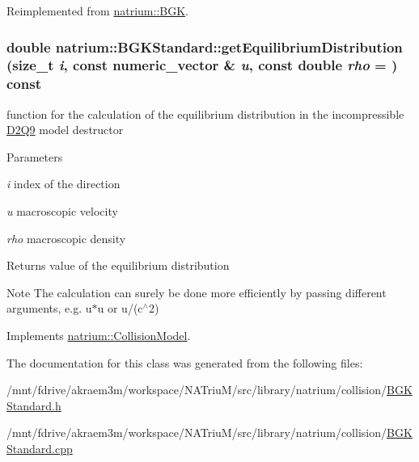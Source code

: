 Reimplemented from \hyperlink{classnatrium_1_1BGK_ae5e97a4995fe927e9042a6cffac80acc}{natrium::BGK}.\hypertarget{classnatrium_1_1BGKStandard_a3d45ef2fe5536bf14914f99297477754}{
\subsubsection[{getEquilibriumDistribution}]{\setlength{\rightskip}{0pt plus 5cm}double natrium::BGKStandard::getEquilibriumDistribution (size\_\-t {\em i}, \/  const numeric\_\-vector \& {\em u}, \/  const double {\em rho} = {}) const}}
\label{classnatrium_1_1BGKStandard_a3d45ef2fe5536bf14914f99297477754}


function for the calculation of the equilibrium distribution in the incompressible \hyperlink{classnatrium_1_1D2Q9}{D2Q9} model destructor


\begin{DoxyParams}{Parameters}
\item[{\em i}]index of the direction \item[{\em u}]macroscopic velocity \item[{\em rho}]macroscopic density \end{DoxyParams}
\begin{DoxyReturn}{Returns}
value of the equilibrium distribution 
\end{DoxyReturn}
\begin{DoxyNote}{Note}
The calculation can surely be done more efficiently by passing different arguments, e.g. u$\ast$u or u/(c$^\wedge$2) 
\end{DoxyNote}


Implements \hyperlink{classnatrium_1_1CollisionModel_a88b382d63da80e950bc58e8afad769a6}{natrium::CollisionModel}.

The documentation for this class was generated from the following files:\begin{DoxyCompactItemize}
\item 
/mnt/fdrive/akraem3m/workspace/NATriuM/src/library/natrium/collision/\hyperlink{BGKStandard_8h}{BGKStandard.h}\item 
/mnt/fdrive/akraem3m/workspace/NATriuM/src/library/natrium/collision/\hyperlink{BGKStandard_8cpp}{BGKStandard.cpp}\end{DoxyCompactItemize}
